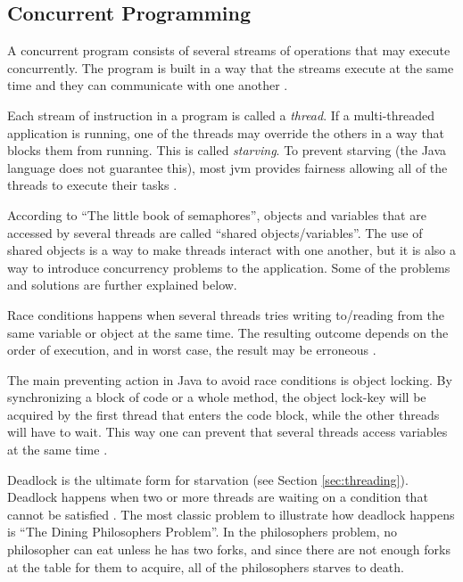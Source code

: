 \subsection{Concurrent Programming}
\label{sec:concurrentprog}
A concurrent program consists of several streams of operations that may execute concurrently. The program is built in a way that the streams execute at the same time and they can communicate with one another \cite{cartwright2000}.

\label{sec:threading}
Each stream of instruction in a program is called a \textit{thread}. If a multi-threaded application is running, one of the threads may override the others in a way that blocks them from running. This is called \textit{starving}. To prevent starving (the Java language does not guarantee this), most \acrshort{jvm} provides fairness allowing all of the threads to execute their tasks \cite{cartwright2000}.

\label{sec:sharedobj}
According to ``The little book of semaphores''\cite{downey2008}, objects and variables that are accessed by several threads are called ``shared objects/variables''. The use of shared objects is a way to make threads interact with one another, but it is also a way to introduce concurrency problems to the application. Some of the problems and solutions are further explained below.

\label{sec:raisedcond}

Race conditions happens when several threads tries writing to/reading from the same variable or object at the same time. The resulting outcome depends on the order of execution, and in worst case, the result may be erroneous \cite{stevecarr2003}. 

\label{sec:synchronization}
The main preventing action in Java to avoid race conditions is object locking. By synchronizing a block of code or a whole method, the object lock-key will be acquired by the first thread that enters the code block, while the other threads will have to wait. This way one can prevent that several threads access variables at the same time \cite{cartwright2000}.


\newpage
{}
\label{sec:deadlock}
Deadlock is the ultimate form for starvation (see Section \ref{sec:threading}). Deadlock happens when two or more threads are waiting on a condition that cannot be satisfied \cite{sunmicrosystems2005}. The most classic problem to illustrate how deadlock happens is ``The Dining Philosophers Problem''\cite{cartwright2000v2}. In the philosophers problem, no philosopher can eat unless he has two forks, and since there are not enough forks at the table for them to acquire, all of the philosophers starves to death.
